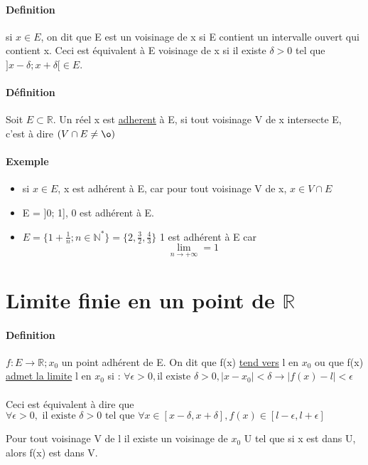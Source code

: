 \paragraph{Definition} si $x \in E$, on dit que E est un voisinage de x si E contient un intervalle ouvert qui contient x. Ceci est équivalent à E voisinage de x si il existe $\delta > 0$  tel que $]x - \delta; x + \delta[ \in E$.

\paragraph{Définition} Soit $E \subset \mathbb{R}$. Un réel x est \ul{adherent} à E, si tout voisinage V de x intersecte E, c'est à dire $(V \cap E \neq \o)$

\paragraph{Exemple} 
\begin{itemize}
	\item si $x \in E$, x est adhérent à E, car pour tout voisinage V de x, $x \in V \cap E$
	\item E = ]0; 1], 0 est adhérent à E.
	\item $E = \{1 + \frac{1}{n}; n \in \mathbb{N}^*\} = \{2, \frac{3}{2}, \frac{4}{3}\}$
		1 est adhérent à E car \[\lim_{n \to +\infty} = 1\]
\end{itemize}

\section{Limite finie en un point de $\mathbb{R}$}

\paragraph{Definition} $f : E \rightarrow \mathbb{R}; x_0$ un point adhérent de E.
On dit que f(x) \ul{tend vers} l en $x_0$ ou que f(x) \ul{admet la limite} l en $x_0$ si :
$\forall \epsilon > 0, \text{il existe } \delta > 0, |x - x_0| < \delta \rightarrow |f(x) - l| < \epsilon$
~\\
~\\ 
Ceci est équivalent à dire que $\forall \epsilon > 0, \text{ il existe } \delta > 0 \text{ tel que } \forall x \in [x-\delta, x+\delta], f(x) \in [l-\epsilon, l+\epsilon]$

Pour tout voisinage V de l il existe un voisinage de $x_0$ U tel que si x est dans U, alors f(x) est dans V.
